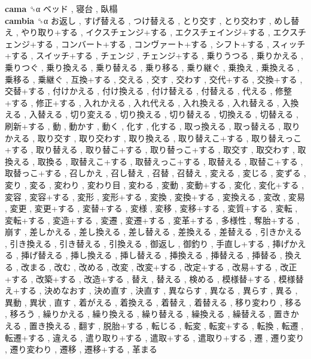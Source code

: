 \textbf{cama} ␝α   ベッド ,  寝台 ,  臥榻   \\
\textbf{cambia} ␝α   お返し ,  すげ替える ,  つけ替える ,  とり交す ,  とり交わす ,  めし替え ,  やり取り+する ,  イクスチェンジ+する ,  エクスチェインジ+する ,  エクスチェンジ+する ,  コンバート+する ,  コンヴァート+する ,  シフト+する ,  スィッチ+する ,  スイッチ+する ,  チェンジ ,  チェンジ+する ,  乗りうつる ,  乗りかえる ,  乗りつぐ ,  乗り換える ,  乗り替える ,  乗り移る ,  乗り継ぐ ,  乗換え ,  乗換える ,  乗移る ,  乗継ぐ ,  互換+する ,  交える ,  交す ,  交わす ,  交代+する ,  交換+する ,  交替+する ,  付けかえる ,  付け換える ,  付け替える ,  付替える ,  代える ,  修整+する ,  修正+する ,  入れかえる ,  入れ代える ,  入れ換える ,  入れ替える ,  入換える ,  入替える ,  切り変える ,  切り換える ,  切り替える ,  切換える ,  切替える ,  刷新+する ,  動 ,  動かす ,  動く ,  化す ,  化する ,  取っ換える ,  取っ替える ,  取りかえる ,  取り交す ,  取り交わす ,  取り換える ,  取り替えこ+する ,  取り替えっこ+する ,  取り替える ,  取り替こ+する ,  取り替っこ+する ,  取交す ,  取交わす ,  取換える ,  取換る ,  取替えこ+する ,  取替えっこ+する ,  取替える ,  取替こ+する ,  取替っこ+する ,  召しかえ ,  召し替え ,  召替 ,  召替え ,  変える ,  変じる ,  変ずる ,  変り ,  変る ,  変わり ,  変わり目 ,  変わる ,  変動 ,  変動+する ,  変化 ,  変化+する ,  変容 ,  変容+する ,  変形 ,  変形+する ,  変換 ,  変換+する ,  変換える ,  変改 ,  変易 ,  変更 ,  変更+する ,  変替+する ,  変様 ,  変移 ,  変移+する ,  変質+する ,  変転 ,  変転+する ,  変造+する ,  変遷 ,  変遷+する ,  変革+する ,  多様性 ,  奪胎+する ,  崩す ,  差しかえる ,  差し換える ,  差し替える ,  差換える ,  差替える ,  引きかえる ,  引き換える ,  引き替える ,  引換える ,  御返し ,  御釣り ,  手直し+する ,  挿げかえる ,  挿げ替える ,  挿し換える ,  挿し替える ,  挿換える ,  挿替える ,  挿替る ,  換える ,  改まる ,  改む ,  改める ,  改変 ,  改変+する ,  改定+する ,  改易+する ,  改正+する ,  改築+する ,  改造+する ,  替え ,  替える ,  検める ,  模様替+する ,  模様替え+する ,  決めなおす ,  決め直す ,  決直す ,  異ならす ,  異なる ,  異らす ,  異る ,  異動 ,  異状 ,  直す ,  着がえる ,  着換える ,  着替え ,  着替える ,  移り変わり ,  移る ,  移ろう ,  繰りかえる ,  繰り換える ,  繰り替える ,  繰換える ,  繰替える ,  置きかえる ,  置き換える ,  翻す ,  脱胎+する ,  転じる ,  転変 ,  転変+する ,  転換 ,  転遷 ,  転遷+する ,  違える ,  遣り取り+する ,  遣取+する ,  遣取り+する ,  遷 ,  遷り変り ,  遷り変わり ,  遷移 ,  遷移+する ,  革まる   \\
